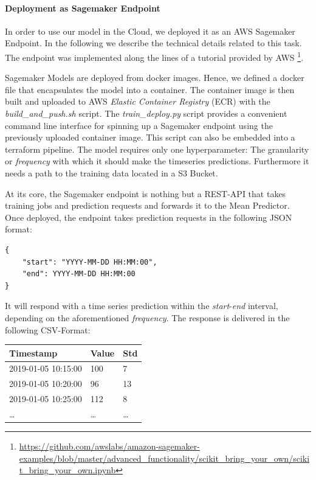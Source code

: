 \paragraph{Deployment as Sagemaker Endpoint}
In order to use our model in the Cloud, we deployed it as an AWS Sagemaker Endpoint. In the following we describe the technical details related to this task. The endpoint was implemented along the lines of a tutorial provided by AWS \footnote{\url{https://github.com/awslabs/amazon-sagemaker-examples/blob/master/advanced_functionality/scikit_bring_your_own/scikit_bring_your_own.ipynb}}.

Sagemaker Models are deployed from docker images. Hence, we defined a docker file that encapsulates the model into a container. The container image is then built and uploaded to AWS \textit{Elastic Container Registry} (ECR) with the \textit{build\_and\_push.sh} script. The \textit{train\_deploy.py} script provides a convenient command line interface for spinning up a Sagemaker endpoint using the previously uploaded container image. This script can also be embedded into a terraform pipeline.
The model requires only one hyperparameter: The granularity or \textit{frequency} with which it should make the timeseries predictions. Furthermore it needs a path to the training data located in a S3 Bucket.

At its core, the Sagemaker endpoint is nothing but a REST-API that takes training jobs and prediction requests and forwards it to the Mean Predictor. Once deployed, the endpoint takes prediction requests in the following JSON format:

\begin{lstlisting}
{
    "start": "YYYY-MM-DD HH:MM:00",
    "end": YYYY-MM-DD HH:MM:00
}
\end{lstlisting}

It will respond with a time series prediction within the \textit{start}-\textit{end} interval, depending on the aforementioned \textit{frequency}. The response is delivered in the following CSV-Format:

\begin{center}
    \begin{tabular}{ | l | l | l |}
    \hline
    Timestamp & Value & Std \\ \hline
    2019-01-05 10:15:00 & 100 & 7 \\ \hline
    2019-01-05 10:20:00 & 96 & 13 \\ \hline
    2019-01-05 10:25:00 & 112 & 8 \\ \hline
    \dots & \dots & \dots \\
    \hline
    \end{tabular}
\end{center}

